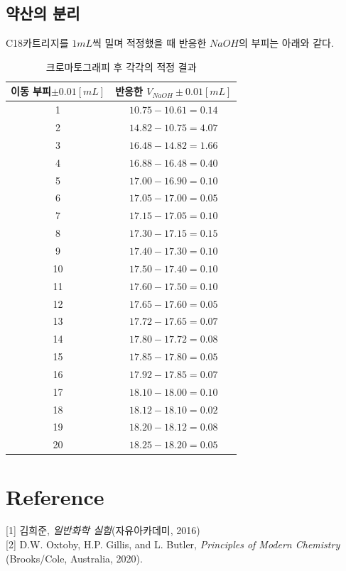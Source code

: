 \documentclass[%
 reprint,
 amsmath,amssymb,
 aps,
]{revtex4-2}
\begin{document}
\subsection{\label{sec:level2}약산의 분리}
C18카트리지를 $1mL$씩 밀며 적정했을 때 반응한 $NaOH$의 부피는 아래와 같다.
\begin{table}[]
\begin{tabular}{c|c} \hline \hline
이동 부피$\pm 0.01 [mL]$ & 반응한 $V_{NaOH} \pm0.01 [mL]$ \\ \hline
1 & $10.75-10.61 =0.14$\\ \hline
2 & $14.82-10.75=4.07$\\ \hline
3 & $16.48-14.82=1.66$\\ \hline
4 &$ 16.88-16.48=0.40$\\ \hline
5 &$ 17.00-16.90=0.10$\\ \hline
6 &$ 17.05-17.00=0.05$\\ \hline
7 &$ 17.15-17.05=0.10$\\ \hline
8 &$ 17.30-17.15=0.15$\\ \hline
9 &$ 17.40-17.30=0.10$\\ \hline
10 &$ 17.50-17.40=0.10$\\ \hline
11 &$ 17.60-17.50=0.10$\\ \hline
12 &$ 17.65-17.60=0.05$\\ \hline
13 &$ 17.72-17.65=0.07$\\ \hline
14 &$ 17.80-17.72=0.08$\\ \hline
15 &$ 17.85-17.80=0.05$\\ \hline
16 &$ 17.92-17.85=0.07$\\ \hline
17 &$ 18.10-18.00=0.10$\\ \hline
18 &$ 18.12-18.10=0.02$\\ \hline
19 &$ 18.20-18.12=0.08$\\ \hline
20 &$ 18.25-18.20=0.05$\\ \hline \hline
\end{tabular}
\caption{\label{tab:C18}크로마토그래피 후 각각의 적정 결과}
\end{table}

\section{\label{sec:level1}Reference}
[1] 김희준, \textit{일반화학 실험}(자유아카데미, 2016)\\

[2] D.W. Oxtoby, H.P. Gillis, and L. Butler, \textit{Principles of Modern Chemistry} (Brooks/Cole, Australia, 2020).
\end{document}
